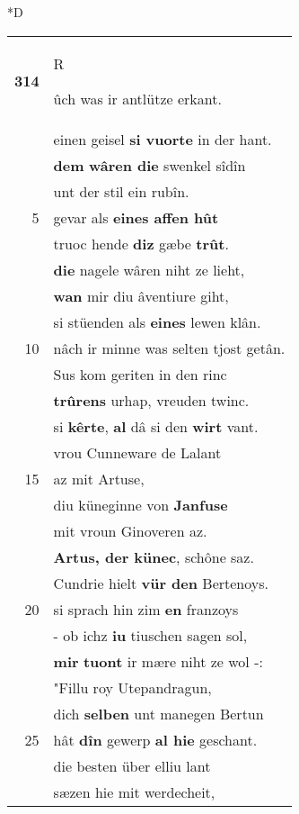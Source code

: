 \documentclass[8pt,a4paper,notitlepage]{article}
\begin{document}
\begin{table}[ht]
\begin{minipage}[t]{0.5\linewidth}
\small
\begin{center}*D
\end{center}
\begin{tabular}{rl}
\textbf{314} & \begin{large}R\end{large}ûch was ir antlütze erkant.\\ 
 & einen geisel \textbf{si vuorte} in der hant.\\ 
 & \textbf{dem} \textbf{wâren die} swenkel sîdîn\\ 
 & unt der stil ein rubîn.\\ 
5 & gevar als \textbf{eines affen hût}\\ 
 & truoc hende \textbf{diz} gæbe \textbf{trût}.\\ 
 & \textbf{die} nagele wâren niht ze lieht,\\ 
 & \textbf{wan} mir diu âventiure giht,\\ 
 & si stüenden als \textbf{eines} lewen klân.\\ 
10 & nâch ir minne was selten tjost getân.\\ 
 & Sus kom geriten in den rinc\\ 
 & \textbf{trûrens} urhap, vreuden twinc.\\ 
 & si \textbf{kêrte}, \textbf{al} dâ si den \textbf{wirt} vant.\\ 
 & vrou Cunneware de Lalant\\ 
15 & az mit Artuse,\\ 
 & diu küneginne von \textbf{Janfuse}\\ 
 & mit vroun Ginoveren az.\\ 
 & \textbf{Artus, der künec}, schône saz.\\ 
 & Cundrie hielt \textbf{vür den} Bertenoys.\\ 
20 & si sprach hin zim \textbf{en} franzoys\\ 
 & - ob ichz \textbf{iu} tiuschen sagen sol,\\ 
 & \textbf{mir} \textbf{tuont} ir mære niht ze wol -:\\ 
 & "Fillu roy Utepandragun,\\ 
 & dich \textbf{selben} unt manegen Bertun\\ 
25 & hât \textbf{dîn} gewerp \textbf{al hie} geschant.\\ 
 & die besten über elliu lant\\ 
 & sæzen hie mit werdecheit,\\ 

\end{tabular}
\end{minipage}
\end{table}
\end{document}
